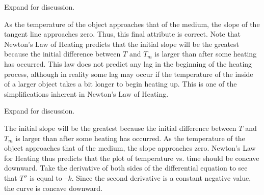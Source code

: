 \documentclass{ximera}
\begin{document}
\begin{problem}
\begin{center}
\end{center}
 
Expand for discussion.
 
\begin{expandable}
    As the temperature of the object approaches that of the medium, the slope of the tangent line approaches zero.  Thus, this final attribute is correct.  Note that Newton’s Law of Heating predicts that the initial slope will be the greatest because the initial difference between $T$ and $T_m$ is larger than after some heating has occurred.  This law does not predict any lag in the beginning of the heating process, although in reality some lag may occur if the temperature of the inside of a larger object takes a bit longer to begin heating up.  This is one of the simplifications inherent in Newton's Law of Heating.
 \end{expandable}
 
\begin{center} 
\end{center}
 
Expand for discussion.
 
\begin{expandable}
    The initial slope will be the greatest because the initial difference between $T$ and $T_m$ is larger than after some heating has occurred.  As the temperature of the object approaches that of the medium, the slope approaches zero.  Newton’s Law for Heating thus predicts that the plot of temperature vs. time should be concave downward.  Take the derivative of both sides of the differential equation to see that $T''$ is equal to $–k$.  Since the second derivative is a constant negative value, the curve is concave downward.
 \end{expandable}
 

\end{problem}
\end{document}
